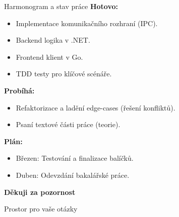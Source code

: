 \documentclass[aspectratio=169, 12pt]{beamer}
\begin{document}
\begin{frame}{Harmonogram a stav práce}
    \textbf{Hotovo:}
    \begin{itemize}
        \item[\checkmark] Implementace komunikačního rozhraní (IPC).
        \item[\checkmark] Backend logika v .NET.
        \item[\checkmark] Frontend klient v Go.
        \item[\checkmark] TDD testy pro klíčové scénáře.
    \end{itemize}

    \textbf{Probíhá:}
    \begin{itemize}
        \item[\textbf{...}] Refaktorizace a ladění edge-cases (řešení konfliktů).
        \item[\textbf{...}] Psaní textové části práce (teorie).
    \end{itemize}

    \textbf{Plán:}
    \begin{itemize}
        \item[$\rightarrow$] Březen: Testování a finalizace balíčků.
        \item[$\rightarrow$] Duben: Odevzdání bakalářské práce.
    \end{itemize}
\end{frame}

\begin{frame}
    \centering
    \Huge \textbf{Děkuji za pozornost}
    
    \vspace{1.5cm}
    \Large Prostor pro vaše otázky
\end{frame}
\end{document}
